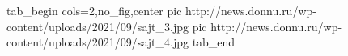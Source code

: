  
 
 
 
 


\ifcmt
  tab_begin cols=2,no_fig,center
     pic http://news.donnu.ru/wp-content/uploads/2021/09/sajt_3.jpg
		 pic http://news.donnu.ru/wp-content/uploads/2021/09/sajt_4.jpg
  tab_end
\fi
